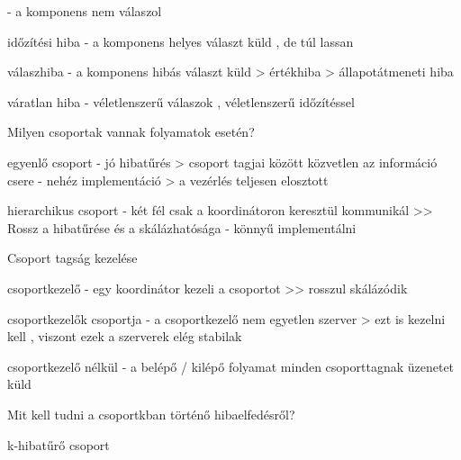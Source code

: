 \documentclass[twoside, a4paper, 12pt]{article}
\begin{document}
\begin{description}
                                        - a komponens nem válaszol
                                    \item időzítési hiba
                                        - a komponens helyes választ küld , de túl lassan
                                    \item válaszhiba
                                        - a komponens hibás választ küld
                                        > értékhiba
                                        > állapotátmeneti hiba
                                    \item váratlan hiba
                                        - véletlenszerű válaszok , véletlenszerű időzítéssel
                                    \item  Milyen csoportak vannak folyamatok esetén?
                                    \item egyenlő csoport
                                        - jó hibatűrés
                                        > csoport tagjai között közvetlen az információ csere
                                        - nehéz implementáció
                                        > a vezérlés teljesen elosztott
                                    \item hierarchikus csoport
                                        - két fél csak a koordinátoron keresztül kommunikál
                                        >> Rossz a hibatűrése és a skálázhatósága
                                        - könnyű implementálni
                                    \item  Csoport tagság kezelése
                                    \item csoportkezelő
                                        - egy koordinátor kezeli a csoportot
                                        >> rosszul skálázódik
                                    \item csoportkezelők csoportja
                                        - a csoportkezelő nem egyetlen szerver
                                        > ezt is kezelni kell , viszont ezek a szerverek elég stabilak
                                    \item csoportkezelő nélkül
                                        - a belépő / kilépő folyamat minden csoporttagnak üzenetet küld
                                    \item  Mit kell tudni a csoportkban történő hibaelfedésről?
                                    \item k-hibatűrő csoport

\end{description}
\end{document}
